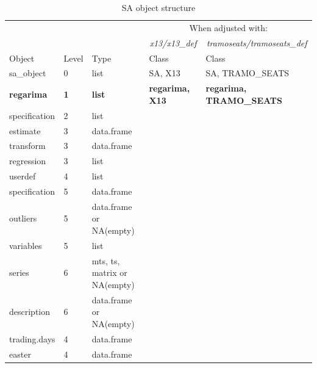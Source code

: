 \documentclass[article]{jss}
\begin{document}
\begingroup\fontsize{7}{9}\selectfont

\begin{longtable}{lllll}
\caption{\label{tab:unnamed-chunk-6}\label{tab:obj_tab}SA object structure}\\
\toprule
\multicolumn{1}{c}{ } & \multicolumn{1}{c}{ } & \multicolumn{1}{c}{ } & \multicolumn{2}{c}{When adjusted with:} \\
\cmidrule(l{3pt}r{3pt}){4-5}
\multicolumn{1}{c}{\em{ }} & \multicolumn{1}{c}{\em{ }} & \multicolumn{1}{c}{\em{ }} & \multicolumn{1}{c}{\em{x13/x13\_def}} & \multicolumn{1}{c}{\em{ tramoseats/tramoseats\_def}} \\
\cmidrule(l{3pt}r{3pt}){4-4} \cmidrule(l{3pt}r{3pt}){5-5}
Object & Level & Type & Class & Class\\
\midrule
sa\_object & 0 & list & SA, X13 & SA, TRAMO\_SEATS\\
\textbf{\hspace{1em}regarima} & \textbf{1} & \textbf{list} & \textbf{regarima, X13} & \textbf{regarima, TRAMO\_SEATS}\\
\hspace{2em}specification & 2 & list &  & \\
\hspace{3em}estimate & 3 & data.frame &  & \\
\hspace{3em}transform & 3 & data.frame &  & \\
\addlinespace
\hspace{3em}regression & 3 & list &  & \\
\hspace{4em}userdef & 4 & list &  & \\
\hspace{5em}specification & 5 & data.frame &  & \\
\hspace{5em}outliers & 5 & data.frame or NA(empty) &  & \\
\hspace{5em}variables & 5 & list &  & \\
\addlinespace
\hspace{6em}series & 6 & mts, ts, matrix or NA(empty) &  & \\
\hspace{6em}description & 6 & data.frame or NA(empty) &  & \\
\hspace{4em}trading.days & 4 & data.frame &  & \\
\hspace{4em}easter & 4 & data.frame &  & \\

\end{longtable}
\end{document}
